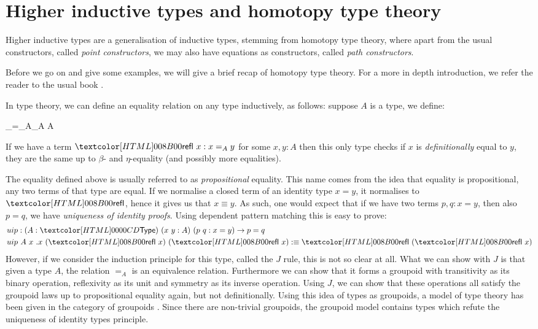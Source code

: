 \section{Higher inductive types and homotopy type theory}

Higher inductive types are a generalisation of inductive types,
stemming from homotopy type theory, where apart from the usual
constructors, called \emph{point constructors}, we may also have
equations as constructors, called \emph{path constructors}.

Before we go on and give some examples, we will give a brief recap of
homotopy type theory. For a more in depth introduction, we refer the
reader to the usual book \cite{UFP2013}.

In type theory, we can define an equality relation on any type
inductively, as follows: suppose $A$ is a type, we define:
%
\begin{datatype}{\_=_A\_}{A \to A \to \Type}
\end{datatype}
%
If we have a term $\refl\ x : x =_A y$ for some $x, y : A$ then this
only type checks if $x$ is \emph{definitionally} equal to $y$, \ie
they are the same up to $\beta$- and $\eta$-equality (and possibly
more equalities). 

The equality defined above is usually referred to as
\emph{propositional} equality. This name comes from the idea that
equality is propositional, \ie any two terms of that type are
equal. If we normalise a closed term of an identity type $x = y$, it
normalises to $\refl$, hence it gives us that $x \equiv y$. As such,
one would expect that if we have two terms $p, q : x = y$, then also
$p = q$, \ie we have \emph{uniqueness of identity proofs}. Using
dependent pattern matching this is easy to prove:
%
\begin{align*}
  &uip : (A : \Type)\ (x\ y : A)\ (p\ q : x = y) \to p = q \\
  &uip\ A\ x\ .x\ (\refl\ x)\ (\refl\ x) \ddefeq \refl\ (\refl\ x)
\end{align*}
%
However, if we consider the induction principle for this type, called
the $J$ rule, this is not so clear at all. What we can show with $J$
is that given a type $A$, the relation $=_A$ is an equivalence
relation. Furthermore we can show that it forms a groupoid with
transitivity as its binary operation, reflexivity as its unit and
symmetry as its inverse operation. Using $J$, we can show that these
operations all satisfy the groupoid laws up to propositional equality
again, but not definitionally. Using this idea of types as groupoids,
a model of type theory has been given in the category of groupoids
\cite{Hofmann1998}. Since there are non-trivial groupoids, the
groupoid model contains types which refute the uniqueness of identity
types principle.

